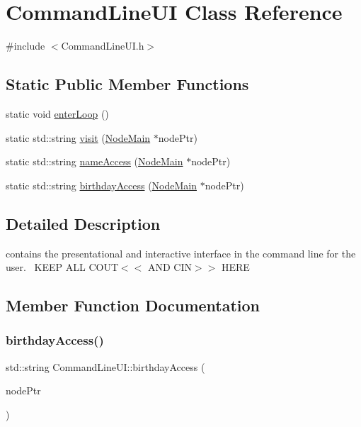 \hypertarget{class_command_line_u_i}{}\section{Command\+Line\+UI Class Reference}
\label{class_command_line_u_i}


{\ttfamily \#include $<$Command\+Line\+U\+I.\+h$>$}

\subsection*{Static Public Member Functions}
\begin{DoxyCompactItemize}
\item 
static void \hyperlink{class_command_line_u_i_ac72a09121b78bdf1ab1f457795fcf370}{enter\+Loop} ()
\item 
static std\+::string \hyperlink{class_command_line_u_i_ad57eb91d3410757e96b2a69194def99a}{visit} (\hyperlink{class_node_main}{Node\+Main} $\ast$node\+Ptr)
\item 
static std\+::string \hyperlink{class_command_line_u_i_a85f5fd4dd9358309be8b400bb9acb9a1}{name\+Access} (\hyperlink{class_node_main}{Node\+Main} $\ast$node\+Ptr)
\item 
static std\+::string \hyperlink{class_command_line_u_i_a2af8a2a3e48bbb519779ded344470ce3}{birthday\+Access} (\hyperlink{class_node_main}{Node\+Main} $\ast$node\+Ptr)
\end{DoxyCompactItemize}


\subsection{Detailed Description}
contains the presentational and interactive interface in the command line for the user.~\newline
K\+E\+EP A\+LL C\+O\+UT$<$$<$ A\+ND C\+IN$>$$>$ H\+E\+RE 

\subsection{Member Function Documentation}
\mbox{\label{class_command_line_u_i_a2af8a2a3e48bbb519779ded344470ce3}} 
\subsubsection{\texorpdfstring{birthday\+Access()}{birthdayAccess()}}
{\footnotesize\ttfamily std\+::string Command\+Line\+U\+I\+::birthday\+Access (\begin{DoxyParamCaption}\item[{\hyperlink{class_node_main}{Node\+Main} $\ast$}]{node\+Ptr }\end{DoxyParamCaption})\hspace{0.3cm}{\ttfamily [static]}}

